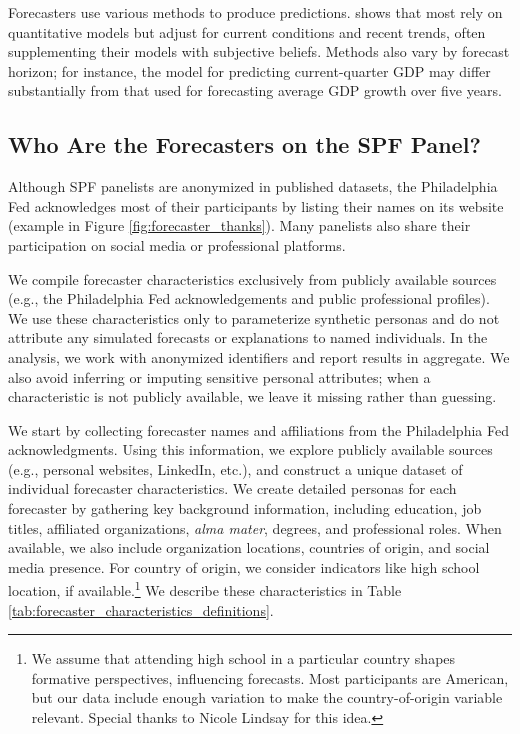 \documentclass[11pt,letterpaper]{scrartcl}
\begin{document}
Forecasters use various methods to produce predictions. \cite{stark2013spf} shows that most rely on quantitative models but adjust for current conditions and recent trends, often supplementing their models with subjective beliefs. Methods also vary by forecast horizon; for instance, the model for predicting current-quarter GDP may differ substantially from that used for forecasting average GDP growth over five years. %

\subsection{Who Are the Forecasters on the SPF Panel?}\label{sec:personas}

Although SPF panelists are anonymized in published datasets, the Philadelphia Fed acknowledges most of their participants by listing their names on its website (example in Figure \ref{fig:forecaster_thanks}). Many panelists also share their participation on social media or professional platforms. 

We compile forecaster characteristics exclusively from publicly available sources (e.g., the Philadelphia Fed acknowledgements and public professional profiles). We use these characteristics only to parameterize synthetic personas and do not attribute any simulated forecasts or explanations to named individuals. In the analysis, we work with anonymized identifiers and report results in aggregate. We also avoid inferring or imputing sensitive personal attributes; when a characteristic is not publicly available, we leave it missing rather than guessing.

We start by collecting forecaster names and affiliations from the Philadelphia Fed acknowledgments. Using this information, we explore publicly available sources (e.g., personal websites, LinkedIn, etc.), and construct a unique dataset of individual forecaster characteristics. We create detailed personas for each forecaster by gathering key background information, including education, job titles, affiliated organizations, \emph{alma mater}, degrees, and professional roles. When available, we also include organization locations, countries of origin, and social media presence. For country of origin, we consider indicators like high school location, if available.\footnote{We assume that attending high school in a particular country shapes formative perspectives, influencing forecasts. Most participants are American, but our data include enough variation to make the country-of-origin variable relevant. Special thanks to Nicole Lindsay for this idea.} We describe these characteristics in Table \ref{tab:forecaster_characteristics_definitions}. 
\end{document}
